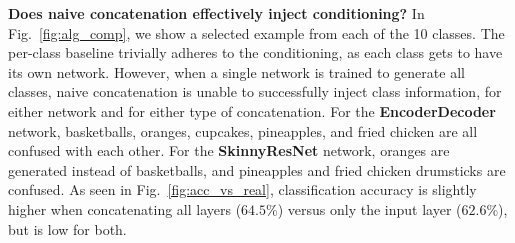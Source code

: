 \vspace{2mm} \noindent \textbf{Does naive concatenation effectively inject conditioning?} In Fig.~\ref{fig:alg_comp}, we show a selected example from each of the 10 classes. The per-class baseline trivially adheres to the conditioning, as each class gets to have its own network. However, when a single network is trained to generate all classes, naive concatenation is unable to successfully inject class information, for either network and for either type of concatenation. For the \textbf{EncoderDecoder} network, basketballs, oranges, cupcakes, pineapples, and fried chicken are all confused with each other. For the \textbf{SkinnyResNet} network, oranges are generated instead of basketballs, and pineapples and fried chicken drumsticks are confused. As seen in Fig.~\ref{fig:acc_vs_real}, classification accuracy is slightly higher when concatenating all layers ($64.5\%$) versus only the input layer ($62.6\%$), but is low for both.


